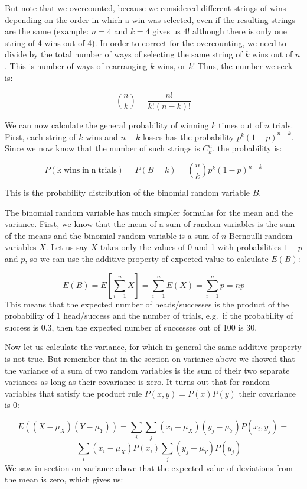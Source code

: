 \documentclass[
  letterpaper,
  DIV=11,
  numbers=noendperiod]{scrreprt}
\begin{document}
But note that we overcounted, because we considered different strings of
wins depending on the order in which a win was selected, even if the
resulting strings are the same (example: \(n=4\) and \(k=4\) gives us
\(4!\) although there is only one string of 4 wins out of 4). In order
to correct for the overcounting, we need to divide by the total number
of ways of selecting the same string of \(k\) wins out of \(n\). This is
number of ways of rearranging \(k\) wins, or \(k!\) Thus, the number we
seek is:

\[\binom{n}{k} = \frac{n!}{k! (n-k)!}\]

We can now calculate the general probability of winning \(k\) times out
of \(n\) trials. First, each string of \(k\) wins and \(n-k\) losses has
the probability \(p^k (1-p)^{n-k}\). Since we now know that the number
of such strings is \(C^n_k\), the probability is:

\[
 P(\mathrm{k \; wins \; in \; n \; trials}) =  P(B=k)= \binom{n}{k}  p^k (1-p)^{n-k}
\]

This is the probability distribution of the binomial random variable
\(B\).

The binomial random variable has much simpler formulas for the mean and
the variance. First, we know that the mean of a sum of random variables
is the sum of the means and the binomial random variable is a sum of
\(n\) Bernoulli random variables \(X\). Let us say \(X\) takes only the
values of 0 and 1 with probabilities \(1-p\) and \(p\), so we can use
the additive property of expected value to calculate \(E(B)\):

\[
E(B) = E\left[\sum_{i=1}^n X\right] = \sum_{i=1}^n E(X) = \sum_{i=1}^n p = np 
\] This means that the expected number of heads/successes is the product
of the probability of 1 head/success and the number of trials, e.g.~if
the probability of success is 0.3, then the expected number of successes
out of 100 is 30.

Now let us calculate the variance, for which in general the same
additive property is not true. But remember that in the section on
variance above we showed that the variance of a sum of two random
variables is the sum of their two separate variances as long as their
covariance is zero. It turns out that for random variables that satisfy
the product rule \(P(x, y) = P(x)P(y)\) their covariance is 0:

\[E((X-\mu_X)(Y-\mu_Y))  =  \sum_i \sum_j (x_i-\mu_X) (y_j-\mu_Y) P(x_i, y_j) =  \]
\[ = \sum_i(x_i-\mu_X)P(x_i) \sum_j (y_j-\mu_Y) P(y_j) \] We saw in
section on variance above that the expected value of deviations from the
mean is zero, which gives us:
\end{document}

